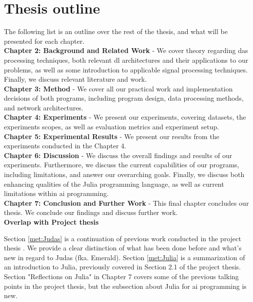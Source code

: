 \section{Thesis outline}

The following list is an outline over the rest of the thesis, and what will be presented for each chapter. \\


\textbf{Chapter 2: Background and Related Work} - We cover theory regarding \acrshort{das} processing techniques, both relevant \acrshort{dl} architectures and their applications to our problems, as well as some introduction to applicable signal processing techniques. Finally, we discuss relevant literature and work.  \\

\textbf{Chapter 3: Method} - We cover all our practical work and implementation decisions of both programs, including program design, data processing methods, and network architectures. \\

\textbf{Chapter 4: Experiments} - We present our experiments, covering datasets, the experiments scopes, as well as evaluation metrics and experiment setup. \\

\textbf{Chapter 5: Experimental Results} - We present our results from the experiments conducted in the Chapter 4. \\

\textbf{Chapter 6: Discussion} - We discuss the overall findings and results of our experiments. Furthermore, we discuss the current capabilities of our programs, including limitations, and answer our overarching goals. Finally, we discuss both enhancing qualities of the Julia programming language, as well as current limitations within \acrshort{ai} programming. \\

\textbf{Chapter 7: Conclusion and Further Work} - This final chapter concludes our thesis. We conclude our findings and discuss further work. \\

\textbf{Overlap with Project thesis}

Section \ref{met:Judas} is a continuation of previous work conducted in the project thesis \cite{projthesis}. We provide a clear distinction of what has been done before and what's new in regard to Judas (fka. Emerald). Section \ref{met:Julia} is a summarization of an introduction to Julia, previously covered in Section 2.1 of the project thesis. Section "Reflections on Julia" in Chapter 7 covers some of the previous talking points in the project thesis, but the subsection about Julia for \acrshort{ai} programming is new.